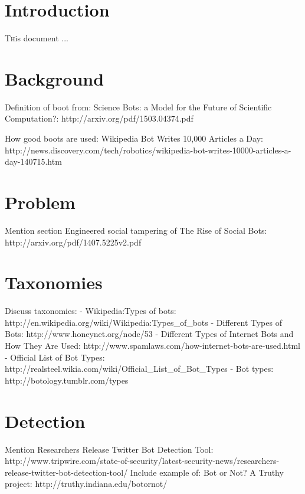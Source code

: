 \documentclass[twoside]{article}
\begin{document}
\begin{multicols}{2} %

\section{Introduction}
\lettrine[nindent=0em,lines=3]{T}his document ...


\section{Background}
Definition of boot from:
Science Bots: a Model for the Future of Scientific Computation?: http://arxiv.org/pdf/1503.04374.pdf

How good boots are used: Wikipedia Bot Writes 10,000 Articles a Day: http://news.discovery.com/tech/robotics/wikipedia-bot-writes-10000-articles-a-day-140715.htm

\section{Problem}
Mention section Engineered social tampering of The Rise of Social Bots: http://arxiv.org/pdf/1407.5225v2.pdf

\section{Taxonomies}
Discuss taxonomies:
 - Wikipedia:Types of bots: http://en.wikipedia.org/wiki/Wikipedia:Types_of_bots
 - Different Types of Bots: http://www.honeynet.org/node/53
 - Different Types of Internet Bots and How They Are Used: http://www.spamlaws.com/how-internet-bots-are-used.html
 - Official List of Bot Types: http://realsteel.wikia.com/wiki/Official_List_of_Bot_Types
 - Bot types: http://botology.tumblr.com/types

\section{Detection}
Mention Researchers Release Twitter Bot Detection Tool: http://www.tripwire.com/state-of-security/latest-security-news/researchers-release-twitter-bot-detection-tool/
Include example of: Bot or Not? A Truthy project: http://truthy.indiana.edu/botornot/



\end{multicols}
\end{document}
